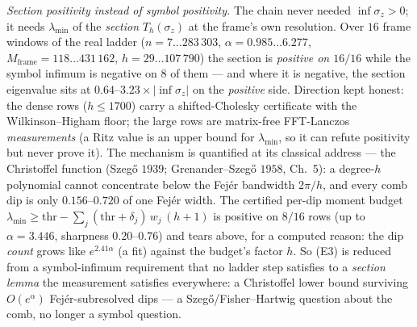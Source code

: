 \documentclass[11pt,a4paper]{article}
\begin{document}
\emph{Section positivity instead of symbol positivity.} The chain never needed
$\inf\sigma_z>0$; it needs $\lambda_{\min}$ of the \emph{section} $T_h(\sigma_z)$ at the frame's
own resolution. Over $16$ frame windows of the real ladder ($n=7\ldots283\,303$,
$\alpha=0.985\ldots6.277$, $M_{\mathrm{frame}}=118\ldots431\,162$, $h=29\ldots107\,790$) the
section is \emph{positive on $16/16$} while the symbol infimum is negative on $8$ of them ---
and where it is negative, the section eigenvalue sits at $0.64$--$3.23\times|\inf\sigma_z|$ on
the \emph{positive} side. Direction kept honest: the dense rows ($h\le1700$) carry a
shifted-Cholesky certificate with the Wilkinson--Higham floor; the large rows are matrix-free
FFT-Lanczos \emph{measurements} (a Ritz value is an upper bound for $\lambda_{\min}$, so it can
refute positivity but never prove it). The mechanism is quantified at its classical address ---
the Christoffel function (Szeg\H{o} $1939$; Grenander--Szeg\H{o} $1958$, Ch.~5): a degree-$h$
polynomial cannot concentrate below the Fej\'er bandwidth $2\pi/h$, and every comb dip is only
$0.156$--$0.720$ of one Fej\'er width. The certified per-dip moment budget
$\lambda_{\min}\ge\mathrm{thr}-\sum_j(\mathrm{thr}+\delta_j)\,w_j\,(h+1)$ is positive on $8/16$
rows (up to $\alpha=3.446$, sharpness $0.20$--$0.76$) and tears above, for a computed reason:
the dip \emph{count} grows like $e^{2.41\alpha}$ (a fit) against the budget's factor $h$. So
(E3) is reduced from a symbol-infimum requirement that no ladder step satisfies to a
\emph{section lemma} the measurement satisfies everywhere: a Christoffel lower bound surviving
$O(e^{\alpha})$ Fej\'er-subresolved dips --- a Szeg\H{o}/Fisher--Hartwig question about the
comb, no longer a symbol question.
\end{document}
